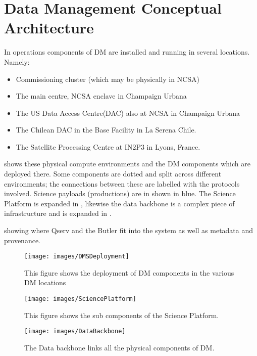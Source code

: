 \section{Data Management Conceptual Architecture} \label{sect:dmarc}

In operations components of DM are installed and running in several locations. Namely:
\begin{itemize}
\item Commissioning cluster (which may be physically in NCSA)
\item The main centre, NCSA enclave in Champaign Urbana
\item The US Data Access Centre(DAC) also at NCSA in Champaign Urbana
\item The Chilean DAC in the Base Facility in La Serena Chile. 
\item The Satellite Processing Centre at IN2P3 in Lyons, France.
\end{itemize}
 shows these physical compute environments  and the DM components which are deployed there. 
 Some components are dotted and split across different
environments; the connections between these are labelled with the
protocols involved.  Science payloads (productions) are in shown in blue.
The Science Platform is expanded in , likewise the data backbone is 
a complex piece of infrastructure and is expanded in .

showing where Qserv and the Butler fit
into the system as well as metadata and provenance.




\begin{figure}[htbp]
\begin{center}
 \texttt{[image: images/DMSDeployment]}
\caption{This figure shows the deployment of DM components in the various DM locations \label{fig:dmsdeploy}}
\end{center}
\end{figure}

\begin{figure}[htbp]
\begin{center}
 \texttt{[image: images/SciencePlatform]}
\caption{This figure shows the sub components of the Science Platform. \label{fig:sciplan}}
\end{center}
\end{figure}


\begin{figure}[htbp]
\begin{center}
 \texttt{[image: images/DataBackbone]}
\caption{The Data backbone links all the physical components of DM. \label{fig:databb}}
\end{center}
\end{figure}

